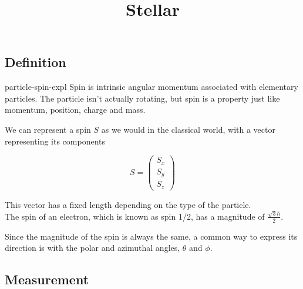 \documentclass[preview]{standalone}
\begin{document}
\title{Stellar}
\genpage

\subsection{Definition}

\begin{snippet}{particle-spin-expl}
    Spin is intrinsic angular momentum associated with elementary particles.
    The particle isn't actually rotating, but spin is a property just like momentum, position, charge and mass.

    We can represent a spin \(S\) as we would in the classical world, with a vector representing its components

    \[
        S=
        \begin{pmatrix}
            S_x \\
            S_y \\
            S_z
        \end{pmatrix}
    \]

    This vector has a fixed length depending on the type of the particle. \\
    The spin of an electron, which is known as spin 1/2, has a magnitude of \(\frac{\sqrt{3}\hbar}{2}\).

    Since the magnitude of the spin is always the same, a common way to express its direction is with the polar and azimuthal angles, \(\theta\) and \(\phi\).
\end{snippet}

\subsection{Measurement}
\end{document}
